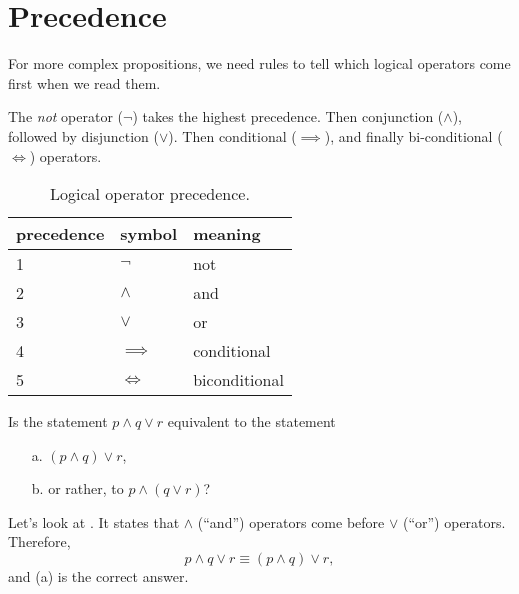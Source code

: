 
\section{Precedence}
For more complex propositions, we need rules to tell which logical operators come first when we read them.

The \emph{not} operator ($\neg$) takes the highest precedence.
Then conjunction ($\land$), followed by disjunction ($\lor$).
Then conditional ($\implies$), and finally bi-conditional ($\iff$) operators.
\begin{table}[H]
  \centering
    \begin{tabular}{lll}
      \toprule
      precedence & symbol & meaning \\ \midrule
      1 & $\neg$      &not\\
      2 & $\land$     &and \\
      3 & $\lor$      & or \\
      4 & $\implies$  & conditional \\
      5 & $\iff$      &biconditional
      \\ \bottomrule
    \end{tabular}
  \caption{Logical operator precedence.}
  \label{tab:precedence}
\end{table}
\begin{ex}
    Is the statement $ p \land q \lor r $ equivalent to the statement
    \begin{enumerate}
        \item[a.] $(p \land q ) \lor r$,
        \item[b.] or rather, to $ p \land (q \lor r)$?
    \end{enumerate}
    \begin{sol}
        Let's look at .
        It states that $\land$ (``and'') operators come before $\lor$ (``or'') operators.
        Therefore,
        \[ p \land q \lor r \equiv (p \land q) \lor r,\]
        and (a) is the correct answer.
    \end{sol}
\end{ex}

